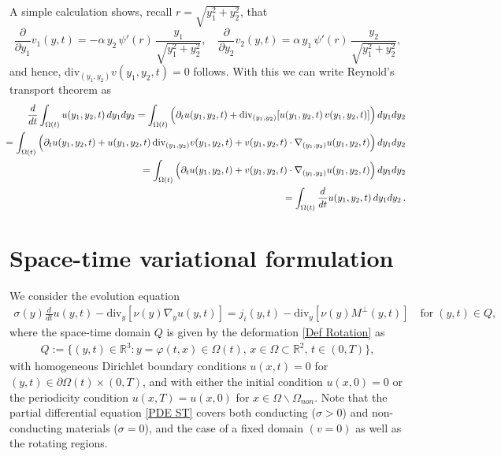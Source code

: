 \documentclass[12pt]{article}
\numberwithin{equation}{section}
\begin{document}
A simple calculation shows, recall $r = \sqrt{y_1^2+y_2^2}$, that
\[
  \frac{\partial}{\partial y_1}v_1(y,t) = - \alpha \, y_2 \, \psi'(r) \,
  \frac{y_1}{\sqrt{y_1^2+y_2^2}}, \quad
  \frac{\partial}{\partial y_2}v_2(y,t) = \alpha \, y_1 \, \psi'(r) \,
  \frac{y_2}{\sqrt{y_1^2+y_2^2}},
\]
and hence, $\text{div}_{(y_1,y_2)}v(y_1,y_2,t)=0$ follows. With this
we can write Reynold's transport theorem as
\begin{eqnarray}
  && \hspace*{-5mm} \frac{d}{dt} \int_{\Omega(t)} u(y_1,y_2,t) \,
  dy_1 dy_2
  =   \int_{\Omega(t)} \Big( \nonumber
        \partial_t u(y_1,y_2,t) +
        \text{div}_{(y_1,y_2)} [u(y_1,y_2,t) \,
        v(y_1,y_2,t)] \Big) \,
        dy_1 dy_2 \\
  && \hspace*{-5mm} = \int_{\Omega(t)} \Big( \nonumber
        \partial_t u(y_1,y_2,t) +
        u(y_1,y_2,t) \, \text{div}_{(y_1,y_2)} 
        v(y_1,y_2,t)
        + v(y_1,y_2,t) \cdot
        \nabla_{(y_1,y_2)} u(y_1,y_2,t)
        \Big) \,
        dy_1 dy_2 \\
  && \hspace*{-5mm} = \int_{\Omega(t)} \Big( \nonumber
        \partial_t u(y_1,y_2,t) 
        + v(y_1,y_2,t) \cdot
        \nabla_{(y_1,y_2)} u(y_1,y_2,t)
        \Big) \,
        dy_1 dy_2 \\
  && \hspace*{-5mm} = \int_{\Omega(t)} 
        \frac{d}{dt} u(y_1,y_2,t) \,
        dy_1 dy_2 \label{Reynolds} \, .
\end{eqnarray}



\section{Space-time variational formulation} \label{sec:var_form}
We consider the evolution equation
\begin{align}\label{PDE ST}
  \sigma(y) \frac{d}{dt} u(y,t) - \mbox{div}_y [\nu(y) \nabla_y u(y,t)]
  = j_i(y,t) - \mbox{div}_y [\nu(y) M^\bot(y,t)] \quad \mbox{for}
  \; (y,t) \in Q,
\end{align}
where the space-time domain $Q$ is given by the deformation
\eqref{Def Rotation} as
\begin{align*}
  Q := \Big \{ (y,t) \in {\mathbb{R}}^3 : y = \varphi(t,x) \in \Omega(t),
  \, x \in \Omega \subset {\mathbb{R}}^2, \, t \in (0,T)\Big\},
\end{align*}
with homogeneous Dirichlet boundary conditions $u(x,t)=0$ for
$(y,t) \in \partial \Omega(t) \times (0,T)$, and with either the initial
condition $u(x,0)=0$ or the periodicity
condition $u(x,T)=u(x,0)$ for $x \in \Omega \backslash \Omega_{non}$.
Note that the partial differential equation \eqref{PDE ST} covers both
conducting ($\sigma>0$) and non-conducting materials ($\sigma=0$),
and the case of a fixed domain $(v=0)$ as well as the rotating
regions.
\end{document}
